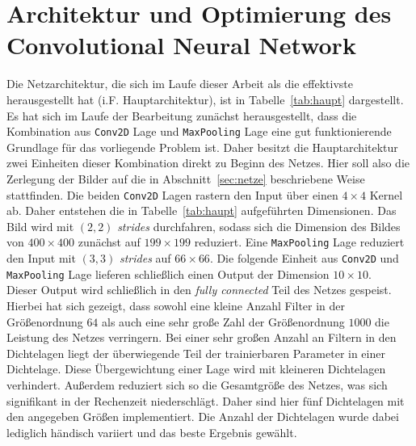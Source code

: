 \chapter{Architektur und Optimierung des Convolutional Neural Network}

Die Netzarchitektur, die sich im Laufe dieser Arbeit als die effektivste
herausgestellt hat (i.F. Hauptarchitektur), ist in Tabelle~\ref{tab:haupt} dargestellt. Es hat
sich im Laufe der Bearbeitung zunächst herausgestellt, dass die Kombination
aus \texttt{Conv2D} Lage und \texttt{MaxPooling} Lage eine gut
funktionierende Grundlage für das vorliegende Problem ist.
Daher besitzt die Hauptarchitektur zwei Einheiten dieser Kombination
direkt zu Beginn des Netzes. Hier soll also die Zerlegung der Bilder auf
die in Abschnitt~\ref{sec:netze} beschriebene Weise stattfinden.
Die beiden \texttt{Conv2D} Lagen rastern den Input über einen $4\times4$
Kernel ab. Daher entstehen die in Tabelle~\ref{tab:haupt} aufgeführten
Dimensionen. Das Bild wird mit $(2, 2)$ \textit{strides} durchfahren,
sodass sich die Dimension des Bildes von $400\times400$ zunächst auf
$199\times199$ reduziert. Eine \texttt{MaxPooling} Lage reduziert den
Input mit $(3, 3)$ \textit{strides} auf $66\times66$. Die folgende Einheit
aus  \texttt{Conv2D} und \texttt{MaxPooling} Lage lieferen schließlich
einen Output der Dimension $10\times10$.\\
Dieser Output wird schließlich in den \textit{fully connected} Teil des
Netzes gespeist. Hierbei hat sich gezeigt, dass sowohl eine kleine Anzahl
Filter in der Größenordnung $64$ als auch eine sehr große Zahl der
Größenordnung $1000$ die Leistung des Netzes verringern. Bei einer sehr großen
Anzahl an Filtern in den Dichtelagen liegt der überwiegende Teil der
trainierbaren Parameter in einer Dichtelage. Diese Übergewichtung einer Lage
wird mit kleineren Dichtelagen verhindert. Außerdem reduziert sich so die
Gesamtgröße des Netzes, was sich signifikant in der Rechenzeit niederschlägt.
Daher sind hier fünf Dichtelagen mit den angegeben Größen implementiert.
Die Anzahl der Dichtelagen wurde dabei lediglich händisch variiert und das
beste Ergebnis gewählt.\\

%
%

